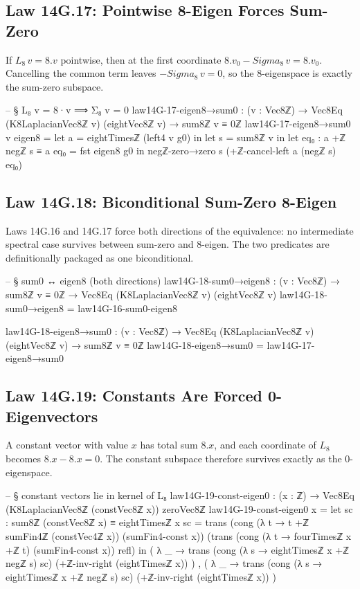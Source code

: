 \documentclass[11pt,a4paper]{book}
\def\Sigma{Sigma}%
\def\Leftrightarrow{<=>}%
\def\cdot{.}%
\def\texorpdfstring#1#2{#2}%
\begin{document}
\subsection{Law 14G.17: Pointwise 8-Eigen Forces Sum-Zero}

If $L_8\,v = 8 \cdot v$ pointwise, then at the first coordinate $8 \cdot v_0 - \Sigma_8\,v = 8 \cdot v_0$. Cancelling the common term leaves $-\Sigma_8\,v = 0$, so the $8$-eigenspace is exactly the sum-zero subspace.

\begin{code}
-- § L₈ v = 8·v ⟹ Σ₈ v = 0
law14G-17-eigen8→sum0 : (v : Vec8ℤ) → Vec8Eq (K8LaplacianVec8ℤ v) (eightVec8ℤ v) → sum8ℤ v ≡ 0ℤ
law14G-17-eigen8→sum0 v eigen8 =
  let a = eightTimesℤ (left4 v g0) in
  let s = sum8ℤ v in
  let eq₀ : a +ℤ negℤ s ≡ a
      eq₀ = fst eigen8 g0
  in
  negℤ-zero→zero s (+ℤ-cancel-left a (negℤ s) eq₀)
\end{code}

\subsection{Law 14G.18: Biconditional Sum-Zero \texorpdfstring{$\Leftrightarrow$}{} 8-Eigen}

Laws 14G.16 and 14G.17 force both directions of the equivalence: no intermediate spectral case survives between sum-zero and $8$-eigen. The two predicates are definitionally packaged as one biconditional.

\begin{code}
-- § sum0 ↔ eigen8 (both directions)
law14G-18-sum0→eigen8 : (v : Vec8ℤ) → sum8ℤ v ≡ 0ℤ → Vec8Eq (K8LaplacianVec8ℤ v) (eightVec8ℤ v)
law14G-18-sum0→eigen8 = law14G-16-sum0-eigen8

law14G-18-eigen8→sum0 : (v : Vec8ℤ) → Vec8Eq (K8LaplacianVec8ℤ v) (eightVec8ℤ v) → sum8ℤ v ≡ 0ℤ
law14G-18-eigen8→sum0 = law14G-17-eigen8→sum0
\end{code}

\subsection{Law 14G.19: Constants Are Forced 0-Eigenvectors}

A constant vector with value $x$ has total sum $8 \cdot x$, and each coordinate of $L_8$ becomes $8 \cdot x - 8 \cdot x = 0$. The constant subspace therefore survives exactly as the $0$-eigenspace.

\begin{code}
-- § constant vectors lie in kernel of L₈
law14G-19-const-eigen0 : (x : ℤ) → Vec8Eq (K8LaplacianVec8ℤ (constVec8ℤ x)) zeroVec8ℤ
law14G-19-const-eigen0 x =
  let sc : sum8ℤ (constVec8ℤ x) ≡ eightTimesℤ x
      sc =
        trans
          (cong (λ t → t +ℤ sumFin4ℤ (constVec4ℤ x)) (sumFin4-const x))
          (trans
            (cong (λ t → fourTimesℤ x +ℤ t) (sumFin4-const x))
            refl)
  in
  ( λ _ →
      trans
        (cong (λ s → eightTimesℤ x +ℤ negℤ s) sc)
        (+ℤ-inv-right (eightTimesℤ x))
  ) ,
  ( λ _ →
      trans
        (cong (λ s → eightTimesℤ x +ℤ negℤ s) sc)
        (+ℤ-inv-right (eightTimesℤ x))
  )
\end{code}
\end{document}
